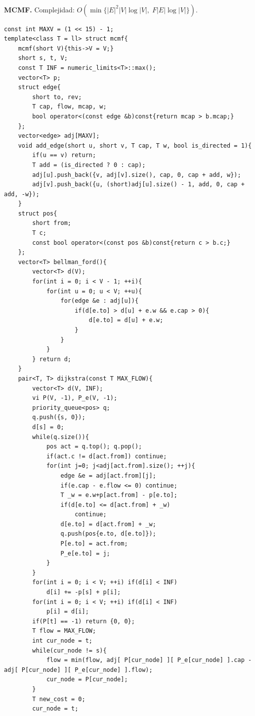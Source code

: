 \documentclass[10pt,spanish,mexico]{article}
\numberwithin{equation}{section}
\begin{document}
\begin{multicols}{2}
\vspace{-1.2\baselineskip}
\hrulefill\\
\textbf{MCMF.} Complejidad: $O(\min\{|E|^2|V|\log |V|, \; F|E|\log |V|\}).$
\begin{verbatim}
const int MAXV = (1 << 15) - 1;
template<class T = ll> struct mcmf{
    mcmf(short V){this->V = V;}
    short s, t, V;
    const T INF = numeric_limits<T>::max();
    vector<T> p;
    struct edge{
        short to, rev;
        T cap, flow, mcap, w;
        bool operator<(const edge &b)const{return mcap > b.mcap;}
    };
    vector<edge> adj[MAXV];
    void add_edge(short u, short v, T cap, T w, bool is_directed = 1){
        if(u == v) return;
        T add = (is_directed ? 0 : cap);
        adj[u].push_back({v, adj[v].size(), cap, 0, cap + add, w});
        adj[v].push_back({u, (short)adj[u].size() - 1, add, 0, cap + add, -w});
    }
    struct pos{
        short from;
        T c;
        const bool operator<(const pos &b)const{return c > b.c;}
    };
    vector<T> bellman_ford(){
        vector<T> d(V);
        for(int i = 0; i < V - 1; ++i){
            for(int u = 0; u < V; ++u){
                for(edge &e : adj[u]){
                    if(d[e.to] > d[u] + e.w && e.cap > 0){
                        d[e.to] = d[u] + e.w;
                    }
                }
            }
        } return d;
    }
    pair<T, T> dijkstra(const T MAX_FLOW){
        vector<T> d(V, INF);
        vi P(V, -1), P_e(V, -1);
        priority_queue<pos> q;
        q.push({s, 0});
        d[s] = 0;
        while(q.size()){
            pos act = q.top(); q.pop();
            if(act.c != d[act.from]) continue;
            for(int j=0; j<adj[act.from].size(); ++j){
                edge &e = adj[act.from][j];
                if(e.cap - e.flow <= 0) continue;
                T _w = e.w+p[act.from] - p[e.to];
                if(d[e.to] <= d[act.from] + _w)
                    continue;
                d[e.to] = d[act.from] + _w;
                q.push(pos{e.to, d[e.to]});
                P[e.to] = act.from;
                P_e[e.to] = j;
            }
        }
        for(int i = 0; i < V; ++i) if(d[i] < INF)
            d[i] += -p[s] + p[i];
        for(int i = 0; i < V; ++i) if(d[i] < INF)
            p[i] = d[i];
        if(P[t] == -1) return {0, 0};
        T flow = MAX_FLOW;
        int cur_node = t;
        while(cur_node != s){
            flow = min(flow, adj[ P[cur_node] ][ P_e[cur_node] ].cap - adj[ P[cur_node] ][ P_e[cur_node] ].flow);
            cur_node = P[cur_node];
        }
        T new_cost = 0;
        cur_node = t;

\end{verbatim}
\end{multicols}
\end{document}
